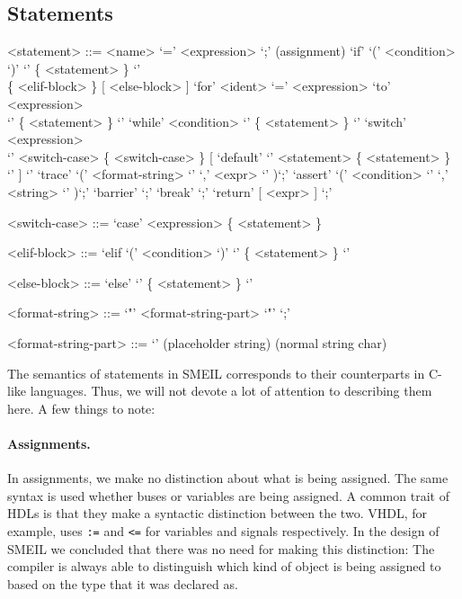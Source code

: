 
\subsection{Statements}
\begin{grammar}
  <statement> ::= <name> `=' <expression> `;' (assignment)
  \alt `if' `(' <condition> `)' `{' \{ <statement> \} `}' \\ \{ <elif-block>
    \} [ <else-block> ]
  \alt `for' <ident> `=' <expression> `to' <expression> \\ `{' \{ <statement> \} `}'
  \alt `while' <condition> `{' \{ <statement> \} `}'
  \alt `switch' <expression> \\ `{' <switch-case> \{ <switch-case> \}
  [ `default' `{' <statement> \{ <statement> \} `}' ] `}'
  \alt `trace' `(' <format-string> `{' `,' <expr> `}' )`;'
  \alt `assert' `(' <condition> `{' `,' <string> `}' )`;'
  \alt `barrier' `;'
  \alt `break' `;'
  \alt `return' [ <expr> ] `;'

  <switch-case> ::= `case' <expression> \{ <statement> \}

  <elif-block> ::= `elif `(' <condition> `)' `{' \{ <statement> \} `}'

  <else-block> ::= `else' `{' \{ <statement> \} `}'

  <format-string> ::= `"' { <format-string-part> } `"' `;'
  
  <format-string-part> ::= `{}' (placeholder string)
   (normal string char)
\end{grammar}

The semantics of statements in SMEIL corresponds to their counterparts in C-like
languages. Thus, we will not devote a lot of attention to describing them
here. A few things to note:

\paragraph{Assignments.} In assignments, we make no distinction about what is
being assigned. The same syntax is used whether buses or variables are being
assigned. A common trait of HDLs is that they make a syntactic distinction
between the two. VHDL, for example, uses \texttt{:=} and \texttt{<=} for
variables and signals respectively. In the design of SMEIL we concluded that
there was no need for making this distinction: The compiler is always able to
distinguish which kind of object is being assigned to based on the type that it
was declared as.


